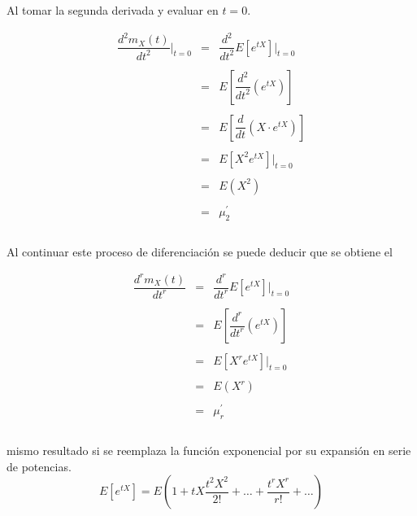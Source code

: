 Al tomar la segunda derivada y evaluar en $t=0$.

$$\begin{array}{rcl}
    \dfrac{d^2m_X(t)}{dt^2}\bigg|_{t=0}&=&\dfrac{d^2}{dt^2}E[e^{tX}]\bigg|_{t=0}\\\\
				       &=&E\left[\dfrac{d^2}{dt^2}(e^{tX})\right]\\\\
				       &=&E\left[\dfrac{d}{dt}(X\cdot e^{tX})\right]\\\\
				       &=&E[X^2 e^{tX}]\bigg|_{t=0}\\\\
				       &=&E(X^2)\\\\
				       &=&\mu_2^{'}\\\\
\end{array}$$	

Al continuar este proceso de diferenciación se puede deducir que se obtiene el 

$$\begin{array}{rcl}
    \dfrac{d^r m_X(t)}{dt^r}&=&\dfrac{d^r}{dt^r}E[e^{tX}]\bigg|_{t=0}\\\\
			    &=&E\left[\dfrac{d^{r}}{dt^r}(e^{tX})\right]\\\\
			    &=&E[X^r e^{tX}]\bigg|_{t=0}\\\\
			    &=&E(X^r)\\\\
			    &=&\mu_r^{'}\\\\
\end{array}$$	

mismo resultado si se reemplaza la función exponencial por su expansión en serie de potencias.
$$E[e^{tX}] = E\left(1 + tX \dfrac{t^2X^2}{2!} + \ldots + \dfrac{t^r X^r}{r!} + \ldots\right)$$\\\\

